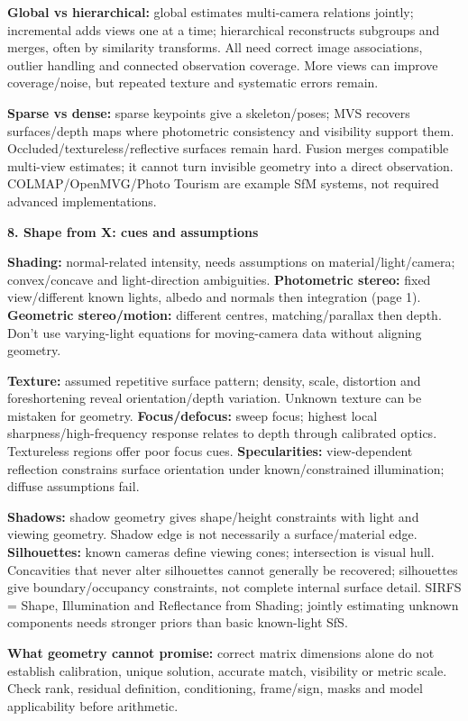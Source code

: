\documentclass[a4paper]{article}
\newcommand{\key}[1]{\textbf{#1}}
\newcommand{\Topic}[1]{\par\vspace{1.7pt}\noindent
  {\fontsize{7.7}{8.0}\selectfont\bfseries #1}\par\vspace{0.3pt}}
\newcounter{sheet}
\newcounter{sheetcolumn}
\newlength{\colwidth}
\newenvironment{sheetcol}[1][7.0]{\stepcounter{sheetcolumn}
  \begin{lrbox}{\columnbox}\begin{minipage}[t]{\colwidth}\vspace{0pt}
  \fontsize{#1}{\dimexpr#1pt+0.6pt\relax}\selectfont}
  {\end{minipage}\end{lrbox}
  \typeout{CV1COL|\thesheet|\thesheetcolumn|\the\dimexpr\ht\columnbox+\dp\columnbox\relax}
  \usebox{\columnbox}\ignorespacesafterend}
\begin{document}
\begin{sheetcol}
\key{Global vs hierarchical:} global estimates multi-camera relations jointly; incremental adds views one at a time; hierarchical reconstructs subgroups and merges, often by similarity transforms. All need correct image associations, outlier handling and connected observation coverage. More views can improve coverage/noise, but repeated texture and systematic errors remain.

\key{Sparse vs dense:} sparse keypoints give a skeleton/poses; MVS recovers surfaces/depth maps where photometric consistency and visibility support them. Occluded/textureless/reflective surfaces remain hard. Fusion merges compatible multi-view estimates; it cannot turn invisible geometry into a direct observation. COLMAP/OpenMVG/Photo Tourism are example SfM systems, not required advanced implementations.

\Topic{8. Shape from X: cues and assumptions}
\key{Shading:} normal-related intensity, needs assumptions on material/light/camera; convex/concave and light-direction ambiguities. \key{Photometric stereo:} fixed view/different known lights, albedo and normals then integration (page 1). \key{Geometric stereo/motion:} different centres, matching/parallax then depth. Don't use varying-light equations for moving-camera data without aligning geometry.

\key{Texture:} assumed repetitive surface pattern; density, scale, distortion and foreshortening reveal orientation/depth variation. Unknown texture can be mistaken for geometry. \key{Focus/defocus:} sweep focus; highest local sharpness/high-frequency response relates to depth through calibrated optics. Textureless regions offer poor focus cues. \key{Specularities:} view-dependent reflection constrains surface orientation under known/constrained illumination; diffuse assumptions fail.

\key{Shadows:} shadow geometry gives shape/height constraints with light and viewing geometry. Shadow edge is not necessarily a surface/material edge. \key{Silhouettes:} known cameras define viewing cones; intersection is visual hull. Concavities that never alter silhouettes cannot generally be recovered; silhouettes give boundary/occupancy constraints, not complete internal surface detail. SIRFS = Shape, Illumination and Reflectance from Shading; jointly estimating unknown components needs stronger priors than basic known-light SfS.

\key{What geometry cannot promise:} correct matrix dimensions alone do not establish calibration, unique solution, accurate match, visibility or metric scale. Check rank, residual definition, conditioning, frame/sign, masks and model applicability before arithmetic.


\end{sheetcol}
\end{document}
